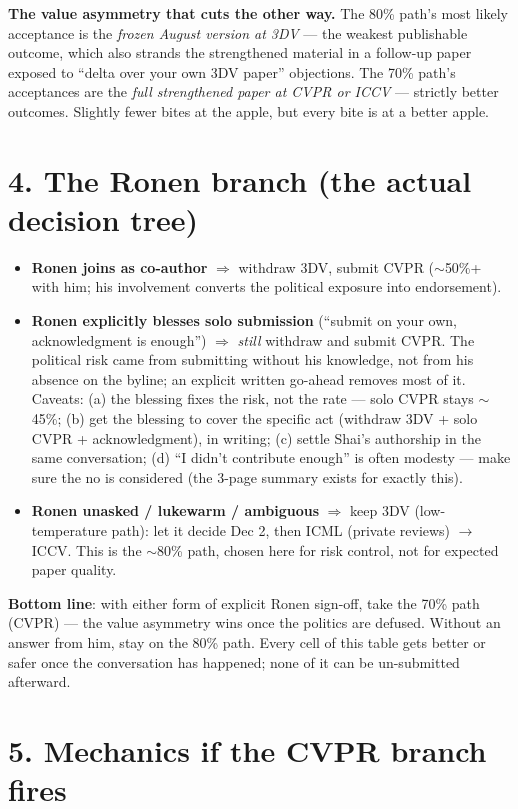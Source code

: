 \documentclass[11pt]{article}
\begin{document}
\textbf{The value asymmetry that cuts the other way.} The 80\% path's most likely acceptance is
the \emph{frozen August version at 3DV} --- the weakest publishable outcome, which also strands
the strengthened material in a follow-up paper exposed to ``delta over your own 3DV paper''
objections. The 70\% path's acceptances are the \emph{full strengthened paper at CVPR or ICCV}
--- strictly better outcomes. Slightly fewer bites at the apple, but every bite is at a better
apple.

\section*{4. The Ronen branch (the actual decision tree)}

\begin{itemize}[leftmargin=1.4em,itemsep=4pt]
\item \textbf{Ronen joins as co-author} $\Rightarrow$ withdraw 3DV, submit CVPR
($\sim$50\%+ with him; his involvement converts the political exposure into endorsement).
\item \textbf{Ronen explicitly blesses solo submission} (``submit on your own, acknowledgment is
enough'') $\Rightarrow$ \emph{still} withdraw and submit CVPR. The political risk came from
submitting without his knowledge, not from his absence on the byline; an explicit written
go-ahead removes most of it. Caveats: (a) the blessing fixes the risk, not the rate --- solo
CVPR stays $\sim$45\%; (b) get the blessing to cover the specific act (withdraw 3DV + solo CVPR
+ acknowledgment), in writing; (c) settle Shai's authorship in the same conversation; (d)
``I didn't contribute enough'' is often modesty --- make sure the no is considered (the 3-page
summary exists for exactly this).
\item \textbf{Ronen unasked / lukewarm / ambiguous} $\Rightarrow$ keep 3DV (low-temperature
path): let it decide Dec 2, then ICML (private reviews) $\rightarrow$ ICCV. This is the
$\sim$80\% path, chosen here for risk control, not for expected paper quality.
\end{itemize}

\textbf{Bottom line}: with either form of explicit Ronen sign-off, take the 70\% path (CVPR) ---
the value asymmetry wins once the politics are defused. Without an answer from him, stay on the
80\% path. Every cell of this table gets better or safer once the conversation has happened;
none of it can be un-submitted afterward.

\section*{5. Mechanics if the CVPR branch fires}
\end{document}
